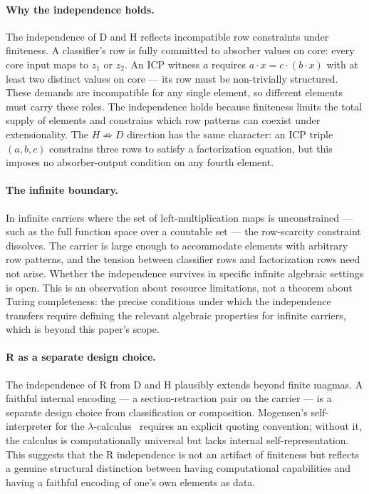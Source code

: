 \documentclass[sigconf,screen]{acmart}
\newcommand{\dotop}{\cdot}
\theoremstyle{remark}
\begin{document}
\paragraph{Why the independence holds.}
The independence of D and H reflects incompatible row constraints under finiteness. A classifier's row is fully committed to absorber values on core: every core input maps to $z_1$ or $z_2$. An ICP witness $a$ requires $a \dotop x = c \dotop (b \dotop x)$ with at least two distinct values on core --- its row must be non-trivially structured. These demands are incompatible for any single element, so different elements must carry these roles. The independence holds because finiteness limits the total supply of elements and constrains which row patterns can coexist under extensionality. The $H \not\Rightarrow D$ direction has the same character: an ICP triple $(a, b, c)$ constrains three rows to satisfy a factorization equation, but this imposes no absorber-output condition on any fourth element.

\paragraph{The infinite boundary.}
In infinite carriers where the set of left-multiplication maps is unconstrained --- such as the full function space over a countable set --- the row-scarcity constraint dissolves. The carrier is large enough to accommodate elements with arbitrary row patterns, and the tension between classifier rows and factorization rows need not arise. Whether the independence survives in specific infinite algebraic settings is open. This is an observation about resource limitations, not a theorem about Turing completeness: the precise conditions under which the independence transfers require defining the relevant algebraic properties for infinite carriers, which is beyond this paper's scope.

\paragraph{R as a separate design choice.}
The independence of R from D and H plausibly extends beyond finite magmas. A faithful internal encoding --- a section-retraction pair on the carrier --- is a separate design choice from classification or composition. Mogensen's self-interpreter for the $\lambda$-calculus~\cite{mogensen92} requires an explicit quoting convention; without it, the calculus is computationally universal but lacks internal self-representation. This suggests that the R independence is not an artifact of finiteness but reflects a genuine structural distinction between having computational capabilities and having a faithful encoding of one's own elements as data.
\end{document}
